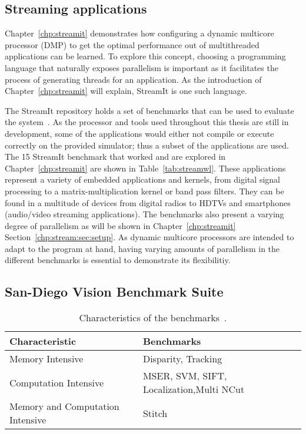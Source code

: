 \subsection{Streaming applications}\label{chp:setup:streamit}

Chapter~\ref{chp:streamit} demonstrates how configuring a dynamic multicore processor (DMP) to get the optimal performance out of multithreaded applications can be learned.
To explore this concept, choosing a programming language that naturally exposes parallelism is important as it facilitates the process of generating threads for an application.
As the introduction of Chapter~\ref{chp:streamit} will explain, StreamIt is one such language.

The StreamIt repository holds a set of benchmarks that can be used to evaluate the system~\cite{streamitrepo}.
As the processor and tools used throughout this thesis are still in development, some of the applications would either not compile or execute correctly on the provided simulator; thus a subset of the applications are used.
The 15 StreamIt benchmark that worked and are explored in Chapter~\ref{chp:streamit} are shown in Table~\ref{tab:streamwl}.
These applications represent a variety of embedded applications and kernels, from digital signal processing to a matrix-multiplication kernel or band pass filters.
They can be found in a multitude of devices from digital radios to HDTVs and smartphones (audio/video streaming applications).
The benchmarks also present a varying degree of parallelism as will be shown in Chapter~\ref{chp:streamit} Section~\ref{chp:stream:sec:setup}.
As dynamic multicore processors are intended to adapt to the program at hand, having varying amounts of parallelism in the different benchmarks is essential to demonstrate its flexibilitiy.

\subsection{San-Diego Vision Benchmark Suite}\label{chp:setup:sdvbs}
\begin{table}[t]
  \smaller
  \centering
 \begin{tabular} { | l | l | }
 \hline
   \cellcolor[gray]{0.7}Characteristic & \cellcolor[gray]{0.7} Benchmarks\\ \hline
    Memory Intensive & Disparity, Tracking\\ \hline
	Computation Intensive & MSER, SVM, SIFT, Localization,Multi NCut\\\hline
	Memory and Computation Intensive & Stitch\\ \hline
   \end{tabular}
  \caption{Characteristics of the benchmarks~\cite{sdvbs}.}\label{tab:sd-vbschar}
\vspace{1em}
  \end{table}
  
